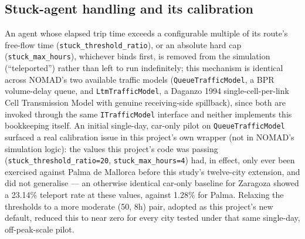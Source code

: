 \documentclass[pdflatex,sn-mathphys-ay]{sn-jnl}
\begin{document}
\subsection{Stuck-agent handling and its calibration}
\label{sec:stuck}

An agent whose elapsed trip time exceeds a configurable multiple of its
route's free-flow time (\texttt{stuck\_threshold\_ratio}), or an absolute
hard cap (\texttt{stuck\_max\_hours}), whichever binds first, is removed from
the simulation (``teleported'') rather than left to run indefinitely; this
mechanism is identical across NOMAD's two available traffic models
(\texttt{QueueTrafficModel}, a BPR volume-delay queue, and
\texttt{LtmTrafficModel}, a Daganzo 1994 single-cell-per-link Cell
Transmission Model with genuine receiving-side spillback), since both are
invoked through the same \texttt{ITrafficModel} interface and neither
implements this bookkeeping itself. An initial single-day, car-only pilot on
\texttt{QueueTrafficModel} surfaced a real calibration issue in this
project's own wrapper (not in NOMAD's simulation logic): the values this
project's code was passing (\texttt{stuck\_threshold\_ratio=20},
\texttt{stuck\_max\_hours=4}) had, in effect, only ever been exercised
against Palma de Mallorca before this study's twelve-city extension, and did
not generalise --- an otherwise identical car-only baseline for Zaragoza
showed a 23.14\% teleport rate at these values, against 1.28\% for Palma.
Relaxing the thresholds to a more moderate (50, 8h) pair, adopted as this
project's new default, reduced this to near zero for every city tested under
that same single-day, off-peak-scale pilot.
\end{document}

